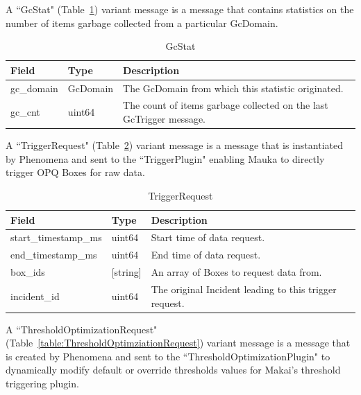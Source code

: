 A ``GcStat" (Table~\ref{table:GcStat}) variant message is a message that contains statistics on the number of items garbage collected from a particular GcDomain.

\begin{table}[H]
	\centering
	\caption{GcStat}
	\begin{tabularx}{\textwidth}{llX}
		\toprule
		\textbf{Field} & \textbf{Type} & \textbf{Description} \\
		\midrule
		gc\_domain & GcDomain & The GcDomain from which this statistic originated. \\
		gc\_cnt & uint64 & The count of items garbage collected on the last GcTrigger message.  \\
		\bottomrule
	\end{tabularx}
	\label{table:GcStat}
\end{table}

A ``TriggerRequest" (Table~\ref{table:TriggerRequest}) variant message is a message that is instantiated by Phenomena and sent to the ``TriggerPlugin" enabling Mauka to directly trigger OPQ Boxes for raw data.

\begin{table}[H]
	\centering
	\caption{TriggerRequest}
	\begin{tabularx}{\textwidth}{llX}
		\toprule
		\textbf{Field} & \textbf{Type} & \textbf{Description} \\
		\midrule
		start\_timestamp\_ms & uint64 & Start time of data request. \\
		end\_timestamp\_ms & uint64 & End time of data request. \\
		box\_ids & [string] & An array of Boxes to request data from. \\
		incident\_id & uint64 & The original Incident leading to this trigger request. \\
		\bottomrule
	\end{tabularx}
	\label{table:TriggerRequest}
\end{table}

A ``ThresholdOptimizationRequest" (Table~\ref{table:ThresholdOptimziationRequest}) variant message is a message that is created by Phenomena and sent to the ``ThresholdOptimizationPlugin" to dynamically modify default or override thresholds values for Makai's threshold triggering plugin.

